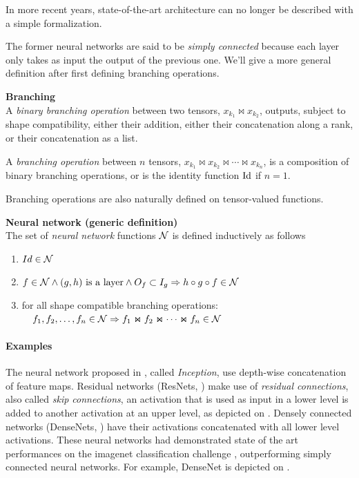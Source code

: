 In more recent years, state-of-the-art architecture can no longer be described with a simple formalization.

The former neural networks are said to be \emph{simply connected} because each layer only takes as input the output of the previous one. We'll give a more general definition after first defining branching operations.

\begin{definition}\textbf{Branching}\\
A \emph{binary branching operation} between two tensors, $x_{k_1} \Join x_{k_2}$, outputs, subject to shape compatibility, either their addition, either their concatenation along a rank, or their concatenation as a list.

A \emph{branching operation} between $n$ tensors, $x_{k_1} \Join x_{k_2} \Join \cdots \Join x_{k_n}$, is a composition of binary branching operations, or is the identity function $\operatorname{Id}$ if $n = 1$.

Branching operations are also naturally defined on tensor-valued functions.%
\end{definition}

\begin{definition}\textbf{Neural network (generic definition)}\\
The set of \emph{neural network} functions $\mathcal{N}$ is defined inductively as follows
\begin{enumerate}
  \item $Id \in \mathcal{N}$
  \item $f \in \mathcal{N} \wedge (g,h) \text{ is a layer} \wedge O_f \subset I_g \Rightarrow h \circ g \circ f \in \mathcal{N}$
  \item for all shape compatible branching operations:\\
  $\quad f_1, f_2, \ldots, f_n \in \mathcal{N} \Rightarrow  f_1 \Join f_2 \Join \cdots \Join f_n \in \mathcal{N}$
\end{enumerate}
\label{def:nn2}
\end{definition}

\paragraph{Examples}
The neural network proposed in \citep{szegedy2015going}, called \emph{Inception}, use depth-wise concatenation of feature maps. Residual networks (ResNets, \cite{he2016deep}) make use of \emph{residual connections}, also called \emph{skip connections}, \ie an activation that is used as input in a lower level is added to another activation at an upper level, as depicted on . Densely connected networks (DenseNets, \cite{huang2017densely}) have their activations concatenated with all lower level activations. These neural networks had demonstrated state of the art performances on the imagenet classification challenge \citep{deng2009imagenet}, outperforming simply connected neural networks. For example, DenseNet is depicted on .
\label{par:branching_ex}

